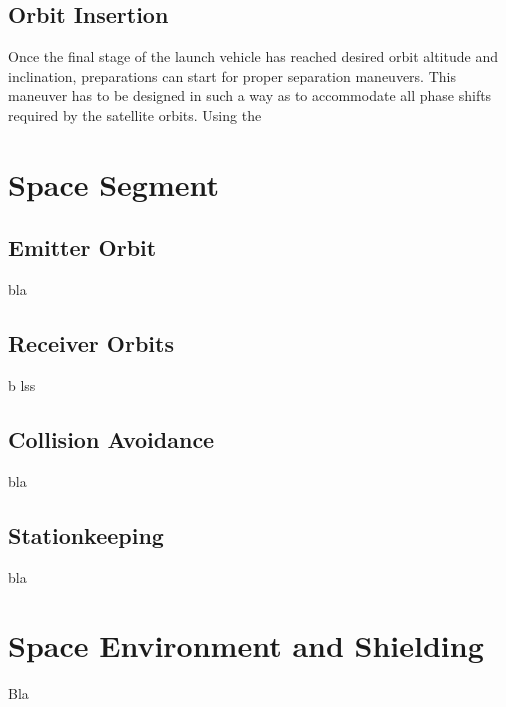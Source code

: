 \subsection{Orbit Insertion}
\label{frLSOI}

Once the final stage of the launch vehicle has reached desired orbit altitude and inclination, preparations can start for proper separation maneuvers. This maneuver has to be designed in such a way as to accommodate all phase shifts required by the satellite orbits. Using the 

\section{Space Segment}
\label{frSS}

\subsection{Emitter Orbit}
\label{frSSEOD}

bla

\subsection{Receiver Orbits}
\label{frSSRO}

b lss

\subsection{Collision Avoidance}
\label{frSSCA}

bla

\subsection{Stationkeeping}
\label{frSSS}

bla

\section{Space Environment and Shielding}
\label{frSEaS}

Bla